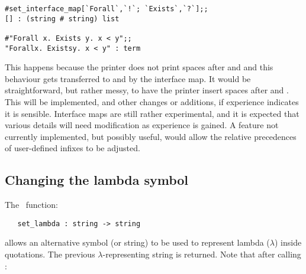{{\setcounter{sessioncount}{1}
\begin{session}\begin{verbatim}
#set_interface_map[`Forall`,`!`; `Exists`,`?`];;
[] : (string # string) list

#"Forall x. Exists y. x < y";;
"Forallx. Existsy. x < y" : term
\end{verbatim}\end{session}

\noindent This happens because the printer does not print spaces after
\ml{!} and  and this behaviour gets transferred to  and
 by the interface map.
It would be straightforward, but rather messy, to have the printer insert 
spaces after  and . This will be implemented, and other 
changes or additions, if experience indicates it is sensible.
Interface maps are still rather
experimental, and it is expected that various details will need 
modification as experience is gained. A feature 
not currently implemented, but possibly useful, would
allow the relative precedences of user-defined infixes to be adjusted.

\subsection{Changing the lambda symbol}
\label{change-lambda}


The \ML\ function:

\begin{boxed}
\begin{verbatim}
   set_lambda : string -> string
\end{verbatim}\end{boxed}

\noindent allows  an  alternative symbol  (or string)  to be  used to represent
lambda ($\lambda$)  inside  quotations.
The  previous $\lambda$-representing
string is returned.  Note that after calling :

}}
